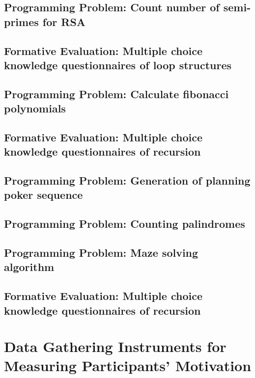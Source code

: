 \newpage
\section{Programming Problem: Count number of semi-primes for RSA}
\label{annex:second-study-pE}

\newpage
\section{Formative Evaluation: Multiple choice knowledge questionnaires of loop structures}
\label{annex:second-study-pos}

\newpage
\section{Programming Problem: Calculate fibonacci polynomials}
\label{annex:second-study-p4}

\newpage
\section{Formative Evaluation: Multiple choice knowledge questionnaires of recursion}
\label{annex:third-study-pre}

\newpage
\section{Programming Problem: Generation of planning poker sequence}
\label{annex:second-study-pF}

\newpage
\section{Programming Problem: Counting palindromes}
\label{annex:second-study-pG}

\newpage
\section{Programming Problem: Maze solving algorithm}
\label{annex:second-study-pH}

\newpage
\section{Formative Evaluation: Multiple choice knowledge questionnaires of recursion}
\label{annex:third-study-pos}

\chapter{Data Gathering Instruments for Measuring Participants' Motivation}
\label{annex:data-gathering-instruments-motivation}

